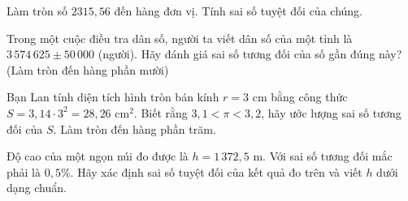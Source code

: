 
\begin{bt}%
	 Làm tròn số $2315{,}56$ đến hàng đơn vị. Tính sai số tuyệt đối của chúng.
\end{bt}

\begin{bt}%
	Trong một cuộc điều tra dân số, người ta viết dân số của một tỉnh là $3\,574\,625 \pm 50\,000$ (người). Hãy đánh giá sai số tương đối  của số gần đúng này?(Làm tròn đến hàng phần mười)
\end{bt}

\begin{bt}%
	Bạn Lan tính diện tích hình tròn bán kính $r=3$ cm bằng công  thức $S=3{,}14 \cdot 3^{2}=28{,}26$ cm$^2$.
	Biết  rằng $3{,}1<\pi<3{,}2$, hãy ước lượng sai số tương đối của $S$. Làm tròn đến hàng phần trăm.
\end{bt}

\begin{bt}%
	Độ cao của một ngọn núi đo được  là $h=1\,372{,}5$ m. Với sai số tương đối mắc phải là $0{,}5\%$. Hãy xác định sai số tuyệt đối của kết quả đo trên và viết $h$ dưới dạng chuẩn.
\end{bt}

